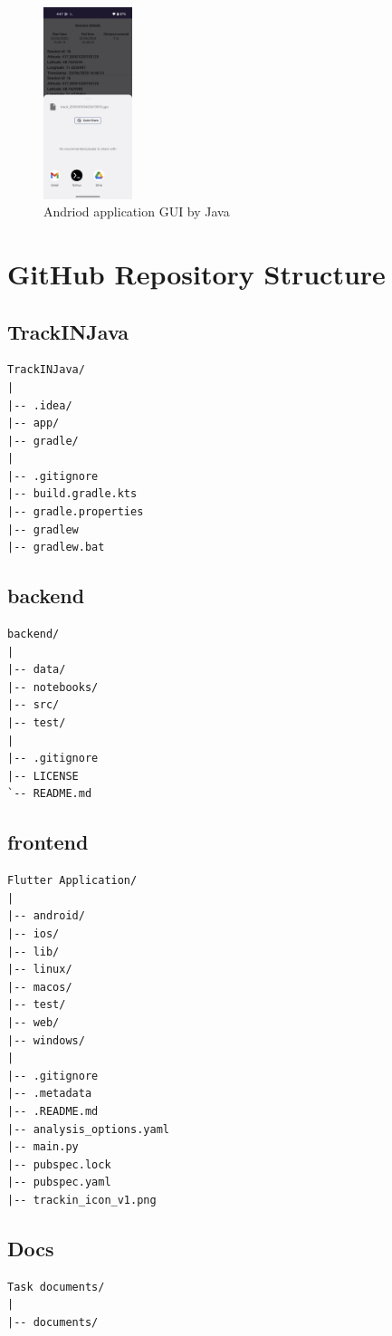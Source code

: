 \documentclass[12pt]{article}
\begin{document}
\begin{figure}[h!]
    \includegraphics[width=0.23\textwidth]{Project_Screenshots/java5.png}
    \caption{Andriod application GUI by Java}
\end{figure}
\clearpage
\section{GitHub Repository Structure}

\subsection*{TrackINJava}
\begin{verbatim}
TrackINJava/
|
|-- .idea/
|-- app/
|-- gradle/
|
|-- .gitignore
|-- build.gradle.kts
|-- gradle.properties
|-- gradlew
|-- gradlew.bat
\end{verbatim}


\subsection*{backend}
\begin{verbatim}
backend/
|
|-- data/
|-- notebooks/
|-- src/
|-- test/
|
|-- .gitignore
|-- LICENSE
`-- README.md
\end{verbatim}

\subsection*{frontend}
\begin{verbatim}
Flutter Application/
|
|-- android/
|-- ios/
|-- lib/
|-- linux/
|-- macos/
|-- test/
|-- web/
|-- windows/
|
|-- .gitignore
|-- .metadata
|-- .README.md
|-- analysis_options.yaml
|-- main.py
|-- pubspec.lock
|-- pubspec.yaml
|-- trackin_icon_v1.png
\end{verbatim}

\subsection*{Docs}
\begin{verbatim}
Task documents/
|
|-- documents/
\end{verbatim}
\end{document}
